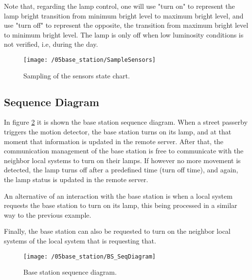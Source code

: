 Note that, regarding the lamp control, one will use "turn on" to represent the lamp bright transition from minimum bright level to maximum bright level, and use "turn off" to represent the opposite, the transition from maximum bright level to minimum bright level. The lamp is only off when low luminosity conditions is not verified, i.e, during the day.

\begin{figure}[ht]
	\centering
	\texttt{[image: /05base\_station/SampleSensors]}
	\caption{Sampling of the sensors state chart.}
	\label{fig:sample_sensors}
\end{figure}

\clearpage
\subsection{Sequence Diagram}
In figure \ref{fig:bs_seq_diagram} it is shown the base station sequence diagram. When a street passerby triggers the motion detector, the base station turns on its lamp, and at that moment that information is updated in the remote server. After that, the communication management of the base station is free to communicate with the neighbor local systems to turn on their lamps. If however no more movement is detected, the lamp turns off after a predefined time (turn off time), and again, the lamp status is updated in the remote server.

An alternative of an interaction with the base station is when a local system requests the base station to turn on its lamp, this being processed in a similar way to the previous example.

Finally, the base station can also be requested to turn on the neighbor local systems of the local system that is requesting that.
\begin{figure}[ht]
	\centering
	\texttt{[image: /05base\_station/BS\_SeqDiagram]}
	\caption{Base station sequence diagram.}
	\label{fig:bs_seq_diagram}
\end{figure}